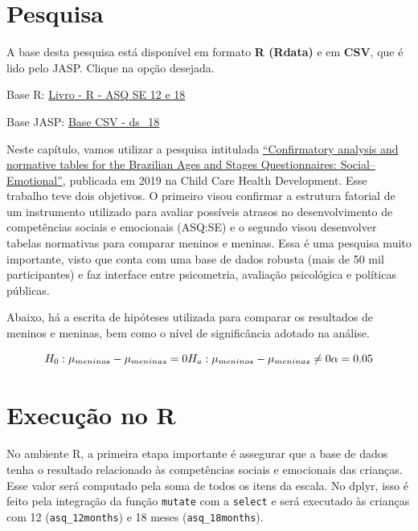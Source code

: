 \documentclass[
]{book}
\newenvironment{base}{
  \definecolor{shadecolor}{rgb}{0, 0, 0}  %
  \color{white}
  \begin{shaded}}
 {\end{shaded}}
\begin{document}
\hypertarget{pesquisa-2}{%
\section{Pesquisa}\label{pesquisa-2}}

\begin{base}

A base desta pesquisa está disponível em formato \textbf{R (Rdata)} e em \textbf{CSV}, que é lido pelo JASP. Clique na opção desejada.

Base R: \href{https://github.com/anovabr/mqt/raw/master/bases/Livro\%20-\%20R\%20-\%20ASQ\%20SE\%2012\%20e\%2018.RData}{Livro - R - ASQ SE 12 e 18}

Base JASP: \href{https://github.com/anovabr/mqt/raw/master/bases/bases_csv_jasp.zip}{Base CSV - ds\_18}

\end{base}

Neste capítulo, vamos utilizar a pesquisa intitulada \href{https://onlinelibrary.wiley.com/doi/abs/10.1111/cch.12649}{``Confirmatory analysis and normative tables for the Brazilian Ages and Stages Questionnaires: Social--Emotional''}, publicada em 2019 na Child Care Health Development. Esse trabalho teve dois objetivos. O primeiro visou confirmar a estrutura fatorial de um instrumento utilizado para avaliar possíveis atrasos no desenvolvimento de competências sociais e emocionais (ASQ:SE) e o segundo visou desenvolver tabelas normativas para comparar meninos e meninas. Essa é uma pesquisa muito importante, visto que conta com uma base de dados robusta (mais de 50 mil participantes) e faz interface entre psicometria, avaliação psicológica e políticas públicas.

Abaixo, há a escrita de hipóteses utilizada para comparar os resultados de meninos e meninas, bem como o nível de significância adotado na análise.

\[H_0: \mu_{meninos} - \mu_{meninas} = 0 \\ H_a: \mu_{meninos} - \mu_{meninas} \neq 0 \\ \alpha = 0.05\]

\hypertarget{execuuxe7uxe3o-no-r-2}{%
\section{Execução no R}\label{execuuxe7uxe3o-no-r-2}}

No ambiente R, a primeira etapa importante é assegurar que a base de dados tenha o resultado relacionado às competências sociais e emocionais das crianças. Esse valor será computado pela soma de todos os itens da escala. No dplyr, isso é feito pela integração da função \texttt{mutate} com a \texttt{select} e será executado às crianças com 12 (\texttt{asq\_12months}) e 18 meses (\texttt{asq\_18months}).
\end{document}
